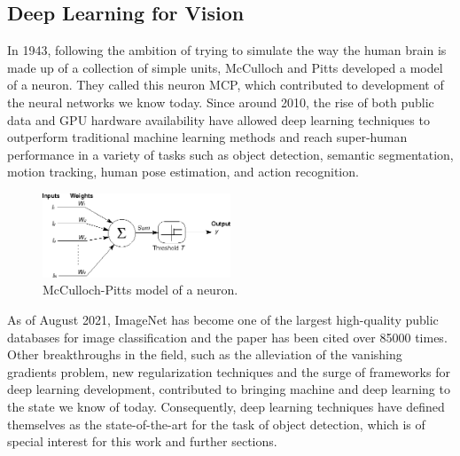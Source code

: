 \subsection{Deep Learning for Vision}\label{appendix:DL-for-vision}
In 1943, following the ambition of trying to simulate the way the human brain is made up of a collection of simple units, McCulloch and Pitts \cite{mcculloch1943logical} developed a model of a neuron. They called this neuron MCP, which contributed to development of the neural networks we know today. Since around 2010, the rise of both public data and GPU hardware availability have allowed deep learning techniques to outperform traditional machine learning methods 
and reach super-human performance in a variety of tasks such as object detection, semantic segmentation, motion tracking, human pose estimation, and action recognition. 


\begin{figure}[!ht]
        \centering
        \includegraphics[width=0.5\textwidth]{images/mcculloch-pitts-model.png}
        \caption{McCulloch-Pitts model of a neuron.}
        \label{fig:mcculloch-neuron}
    \end{figure}


As of August 2021, ImageNet \cite{deng2009imagenet} has become one of the largest high-quality public databases for image classification and the paper  \cite{krizhevsky2017imagenet} has been cited over 85000 times. 
Other breakthroughs in the field, such as the alleviation of the vanishing gradients problem, new regularization techniques and the surge of frameworks for deep learning development, contributed to bringing machine and deep learning to the state we know of today.
Consequently, deep learning techniques have defined themselves as the state-of-the-art for the task of object detection, which is of special interest for this work and further sections. 


